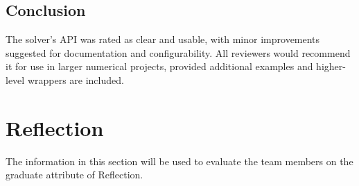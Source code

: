 \documentclass[12pt, titlepage]{article}
\begin{document}
\subsection{Conclusion}

The solver's API was rated as clear and usable, with minor improvements
suggested for documentation and configurability. All reviewers would recommend
it for use in larger numerical projects, provided additional examples and
higher-level wrappers are included.


\section{Reflection}

The information in this section will be used to evaluate the team members on the
graduate attribute of Reflection.



\end{document}
